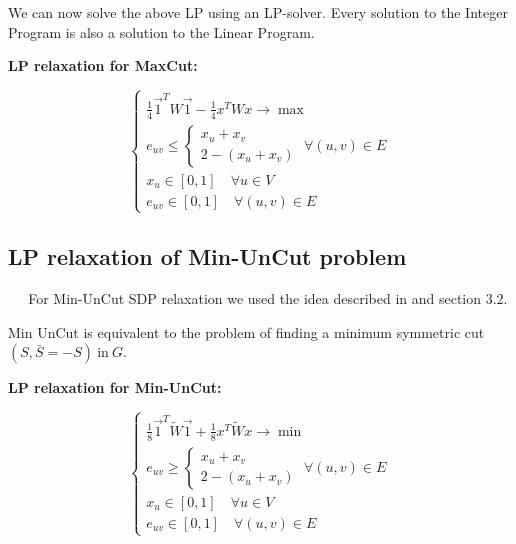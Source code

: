 \documentclass[12pt]{article}
\begin{document}
We can now solve the above LP using an LP-solver. Every solution to the Integer
Program is also a solution to the Linear Program. 

\textbf{LP relaxation for MaxCut:}

\begin{equation}
    \begin{cases}
     \frac14 \vec 1^T W \vec 1 - \frac14 x^T W x \longrightarrow \max \\
	
		e_{uv} \le \begin{cases}
		x_u + x_v \\
		2 - (x_u + x_v)
	\end{cases}
	\; \forall (u,v) \in E\\

	x_u \in [0,1] \quad \forall u \in V\\
	
	e_{uv} \in [0,1] \quad \forall (u,v) \in E
    \end{cases}
\end{equation}

\subsection{LP relaxation of Min-UnCut problem}

$\quad \ \ $For Min-UnCut SDP relaxation we used the idea described in \cite{Arora} and section $3.2$.

Min UnCut is equivalent to the problem
of finding a minimum symmetric cut $(S, \bar{S} = -S) \ \text{in} \ G$.

\textbf{LP relaxation for Min-UnCut:}

\begin{equation}
\begin{cases}
    \frac18 \vec 1^T \tilde W \vec 1 + \frac18 x^T \tilde W x \longrightarrow \min \\
        	e_{uv} \ge \begin{cases}
		x_u + x_v \\
		2 - (x_u + x_v)
	\end{cases}
	\; \forall (u,v) \in E\\

	x_u \in [0,1] \quad \forall u \in V\\
	
	e_{uv} \in [0,1] \quad \forall (u,v) \in E
\end{cases}
\end{equation}
\end{document}
